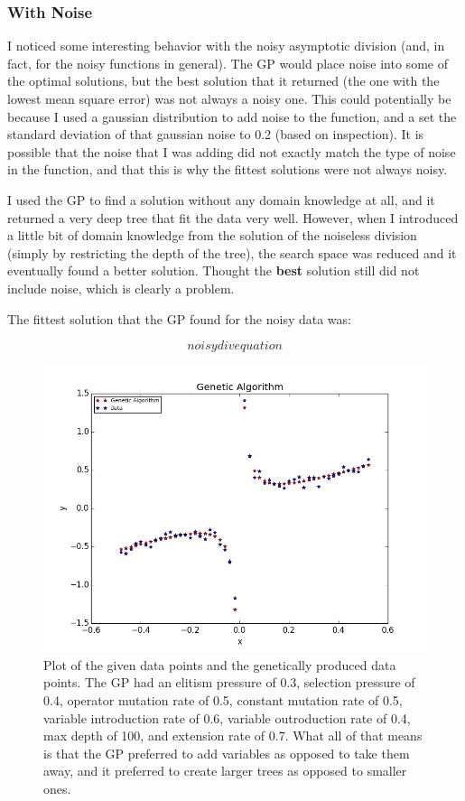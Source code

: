 \documentclass[11pt,amsmath,amssymb]{revtex4}
\begin{document}
\subsubsection{With Noise}
I noticed some interesting behavior with the noisy asymptotic division (and, in fact, for the noisy functions in general). The GP would place noise into some of the optimal solutions, but the best solution that it returned (the one with the lowest mean square error) was not always a noisy one. This could potentially be because I used a gaussian distribution to add noise to the function, and a set the standard deviation of that gaussian noise to 0.2 (based on inspection). It is possible that the noise that I was adding did not exactly match the type of noise in the function, and that this is why the fittest solutions were not always noisy.

I used the GP to find a solution without any domain knowledge at all, and it returned a very deep tree that fit the data very well. However, when I introduced a little bit of domain knowledge from the solution of the noiseless division (simply by restricting the depth of the tree), the search space was reduced and it eventually found a better solution. Thought the {\bf{best}} solution still did not include noise, which is clearly a problem.

The fittest solution that the GP found for the noisy data was:

\begin{equation}
noisy div equation
\end{equation}



\begin{figure}[H]
\center
\includegraphics[scale=0.55]{Div_Noise.png}
\caption{Plot of the given data points and the genetically produced data points. The GP had an elitism pressure of 0.3, selection pressure of 0.4, operator mutation rate of 0.5, constant mutation rate of 0.5, variable introduction rate of 0.6, variable outroduction rate of 0.4, max depth of 100, and extension rate of 0.7. What all of that means is that the GP preferred to add variables as opposed to take them away, and it preferred to create larger trees as opposed to smaller ones.}
\label{q1}
\end{figure}
\end{document}
